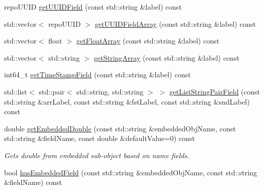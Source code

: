 \begin{DoxyCompactItemize}
repo\+U\+U\+I\+D \hyperlink{classrepo_1_1core_1_1model_1_1_repo_b_s_o_n_abc38f95304405ad3c5f988473fb6e62d}{get\+U\+U\+I\+D\+Field} (const std\+::string \&label) const 
\item 
std\+::vector$<$ repo\+U\+U\+I\+D $>$ \hyperlink{classrepo_1_1core_1_1model_1_1_repo_b_s_o_n_ac42db2ae14159fb1e625bfe7d5578733}{get\+U\+U\+I\+D\+Field\+Array} (const std\+::string \&label) const 
\item 
std\+::vector$<$ float $>$ \hyperlink{classrepo_1_1core_1_1model_1_1_repo_b_s_o_n_aef8f7857b6d4a317d128b627d41a6c7c}{get\+Float\+Array} (const std\+::string \&label) const 
\item 
std\+::vector$<$ std\+::string $>$ \hyperlink{classrepo_1_1core_1_1model_1_1_repo_b_s_o_n_a1f6ee4d979027c5ccd521a8cc90291e5}{get\+String\+Array} (const std\+::string \&label) const 
\item 
int64\+\_\+t \hyperlink{classrepo_1_1core_1_1model_1_1_repo_b_s_o_n_afebb889f385500484149529f93d05179}{get\+Time\+Stamp\+Field} (const std\+::string \&label) const 
\item 
std\+::list$<$ std\+::pair$<$ std\+::string, std\+::string $>$ $>$ \hyperlink{classrepo_1_1core_1_1model_1_1_repo_b_s_o_n_ab4568b7a3f53275af3c0925a8b822137}{get\+List\+String\+Pair\+Field} (const std\+::string \&arr\+Label, const std\+::string \&fst\+Label, const std\+::string \&snd\+Label) const 
\item 
\hypertarget{classrepo_1_1core_1_1model_1_1_repo_b_s_o_n_a0a7279d5d7e3c09a8276e26d18ef4ba4}{}double \hyperlink{classrepo_1_1core_1_1model_1_1_repo_b_s_o_n_a0a7279d5d7e3c09a8276e26d18ef4ba4}{get\+Embedded\+Double} (const std\+::string \&embedded\+Obj\+Name, const std\+::string \&field\+Name, const double \&default\+Value=0) const \label{classrepo_1_1core_1_1model_1_1_repo_b_s_o_n_a0a7279d5d7e3c09a8276e26d18ef4ba4}

\begin{DoxyCompactList}\small\item\em Gets double from embedded sub-\/object based on name fields. \end{DoxyCompactList}\item 
\hypertarget{classrepo_1_1core_1_1model_1_1_repo_b_s_o_n_a3e49b65ed21750fb260f100ed640bec4}{}bool \hyperlink{classrepo_1_1core_1_1model_1_1_repo_b_s_o_n_a3e49b65ed21750fb260f100ed640bec4}{has\+Embedded\+Field} (const std\+::string \&embedded\+Obj\+Name, const std\+::string \&field\+Name) const \label{classrepo_1_1core_1_1model_1_1_repo_b_s_o_n_a3e49b65ed21750fb260f100ed640bec4}


\end{DoxyCompactItemize}
